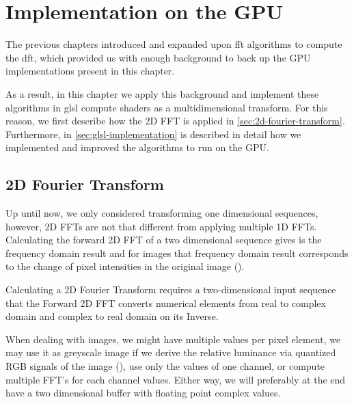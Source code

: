\documentclass[
  oneside,
  11pt, a4paper,
  footinclude=true,
  headinclude=true,
  cleardoublepage=empty
]{scrbook}
\begin{document}
\chapter{Implementation on the GPU}

The previous chapters introduced and expanded upon \acrshort{fft} algorithms to compute the \acrshort{dft}, which provided us with enough background to back up the GPU implementations present in this chapter.

As a result, in this chapter we apply this background and implement these algorithms in \acrshort{glsl} compute shaders as a multidimensional transform. For this reason, we first describe how the 2D FFT is applied in \autoref{sec:2d-fourier-transform}. Furthermore, in \autoref{sec:glsl-implementation} is described in detail how we implemented and improved the algorithms to run on the GPU.


\section{2D Fourier Transform} \label{sec:2d-fourier-transform}

Up until now, we only considered transforming one dimensional sequences, however, 2D FFTs are not that different from applying multiple 1D FFTs. Calculating the forward 2D FFT of a two dimensional sequence gives is the frequency domain result and for images that frequency domain result corresponds to the change of pixel intensities in the original image (\cite{ayres2008measuring}).

Calculating a 2D Fourier Transform requires a two-dimensional input sequence that the Forward 2D FFT converts numerical elements from real to complex domain and complex to real domain on its Inverse.

When dealing with images, we might have multiple values per pixel element, we may use it as greyscale image if we derive the relative luminance via quantized RGB signals of the image (\cite{itu2002parameter}), use only the values of one channel, or compute multiple FFT's for each channel values. Either way, we will preferably at the end have a two dimensional buffer with floating point complex values.
\newline

\end{document}
